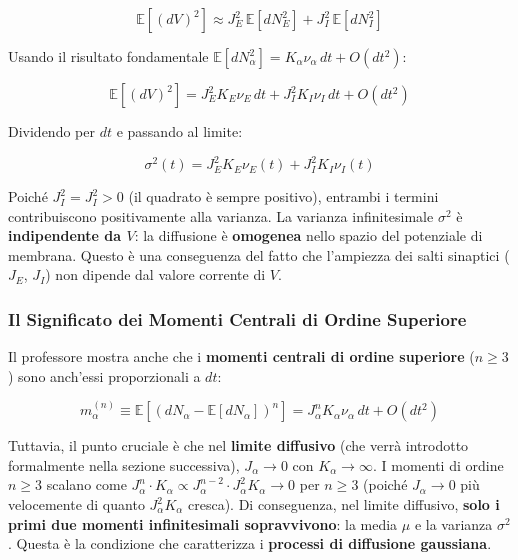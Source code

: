 \begin{equation}
\mathbb{E}[(dV)^2] \approx J_E^2\, \mathbb{E}[dN_E^2] + J_I^2\, \mathbb{E}[dN_I^2]
\end{equation}

Usando il risultato fondamentale $\mathbb{E}[dN_\alpha^2] = K_\alpha \nu_\alpha\, dt + O(dt^2)$:

\begin{equation}
\mathbb{E}[(dV)^2] = J_E^2 K_E \nu_E\, dt + J_I^2 K_I \nu_I\, dt + O(dt^2)
\end{equation}

Dividendo per $dt$ e passando al limite:

\begin{equation}
\sigma^2(t) = J_E^2 K_E \nu_E(t) + J_I^2 K_I \nu_I(t)
\end{equation}

Poiché $J_I^2 = J_I^2 > 0$ (il quadrato è sempre positivo), entrambi i termini contribuiscono positivamente alla varianza. La varianza infinitesimale $\sigma^2$ è \textbf{indipendente da $V$}: la diffusione è \textbf{omogenea} nello spazio del potenziale di membrana. Questo è una conseguenza del fatto che l'ampiezza dei salti sinaptici ($J_E$, $J_I$) non dipende dal valore corrente di $V$.

\subsubsection{Il Significato dei Momenti Centrali di Ordine Superiore}

Il professore mostra anche che i \textbf{momenti centrali di ordine superiore} ($n \geq 3$) sono anch'essi proporzionali a $dt$:

\begin{equation}
m_\alpha^{(n)} \equiv \mathbb{E}[(dN_\alpha - \mathbb{E}[dN_\alpha])^n] = J_\alpha^n K_\alpha \nu_\alpha\, dt + O(dt^2)
\end{equation}

Tuttavia, il punto cruciale è che nel \textbf{limite diffusivo} (che verrà introdotto formalmente nella sezione successiva), $J_\alpha \to 0$ con $K_\alpha \to \infty$. I momenti di ordine $n \geq 3$ scalano come $J_\alpha^n \cdot K_\alpha \propto J_\alpha^{n-2} \cdot J_\alpha^2 K_\alpha \to 0$ per $n \geq 3$ (poiché $J_\alpha \to 0$ più velocemente di quanto $J_\alpha^2 K_\alpha$ cresca). Di conseguenza, nel limite diffusivo, \textbf{solo i primi due momenti infinitesimali sopravvivono}: la media $\mu$ e la varianza $\sigma^2$. Questa è la condizione che caratterizza i \textbf{processi di diffusione gaussiana}.


